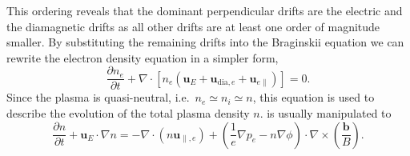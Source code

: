 This ordering reveals that the dominant perpendicular drifts are the electric and the diamagnetic drifts as all other drifts are at least one order of magnitude smaller. By substituting the remaining drifts into the Braginskii equation we can rewrite the electron density equation in a simpler form,
\begin{equation}\label{n_e}
	\frac{\partial n_e}{\partial t} + \nabla \cdot\left[n_e\left(\textbf{u}_E + \textbf{u}_{\mathrm{dia},e}+ \textbf{u}_{e \parallel}\right)\right] = 0.
\end{equation}
Since the plasma is quasi-neutral, i.e.\ $n_e\simeq n_i\simeq n$, this equation is used to describe the evolution of the total plasma density $n$.  is usually manipulated to
\begin{equation}\label{dens}
	\frac{\partial n}{\partial t} + \textbf{u}_E \cdot \nabla n = -\nabla\cdot\left(n\textbf{u}_{\parallel,e}\right) + \left(\frac{1}{e}\nabla p_e - n \nabla \phi\right)\cdot\nabla\times \left(\frac{\textbf{b}}{B}\right).
\end{equation}

